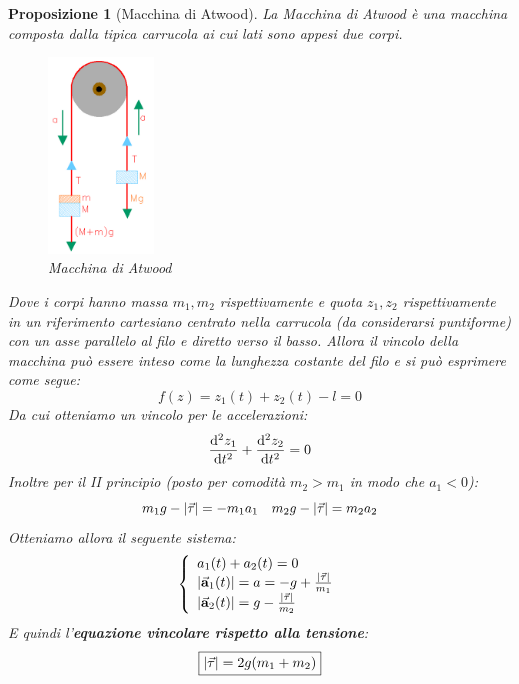 \documentclass{article}
\newtheorem{prop}[defn]{Proposizione}
\renewcommand{\a}{\va{a}}
\begin{document}
\begin{prop}[Macchina di Atwood]
La Macchina di Atwood è una macchina composta dalla tipica carrucola ai cui lati sono appesi due corpi.

\begin{figure}[H]
    \centering
    \includegraphics[width=0.25\textwidth]{0650_d1.png}
    \caption{Macchina di Atwood}
    \label{atwoodmachine}
\end{figure}

Dove i corpi hanno massa $m_1,m_2$ rispettivamente e quota $z_1,z_2$ rispettivamente in un riferimento cartesiano centrato nella carrucola (da considerarsi puntiforme) con un asse parallelo al filo e diretto verso il basso. Allora il vincolo della macchina può essere inteso come la lunghezza costante del filo e si può esprimere come segue:
\[f(z)=z_1(t)+z_2(t)-l=0\]
Da cui otteniamo un vincolo per le accelerazioni:
\[\dv[2]{z_1}{t}+\dv[2]{z_2}{t}=0\]
Inoltre per il II principio (posto per comodità $m_2>m_1$ in modo che $a_1<0$):
\[m_1g-|\va{\tau}|=-m_1a_1\quad m_2g-|\va{\tau}|=m_2a_2\]
Otteniamo allora il seguente sistema:
\[\left\{\begin{array}{l}
    a_1(t)+a_2(t)=0  \\
    |\a_1(t)|=a=-g+\frac{|\va{\tau}|}{m_1}\\
    |\a_2(t)|=g-\frac{|\va{\tau}|}{m_2}
\end{array}\right.\]
E quindi l'\textbf{equazione vincolare rispetto alla tensione}:
\begin{equation}
    \boxed{|\va{\tau}|=2g(m_1+m_2)}
\end{equation}
\end{prop}
\end{document}
